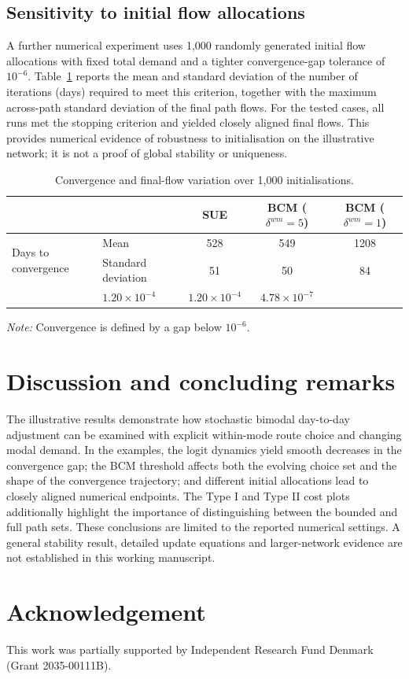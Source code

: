 \documentclass[11pt,a4paper]{article}
\begin{document}
\subsection{Sensitivity to initial flow allocations}

A further numerical experiment uses 1,000 randomly generated initial flow allocations with fixed total demand and a tighter convergence-gap tolerance of $10^{-6}$. Table~\ref{tab:stability} reports the mean and standard deviation of the number of iterations (days) required to meet this criterion, together with the maximum across-path standard deviation of the final path flows. For the tested cases, all runs met the stopping criterion and yielded closely aligned final flows. This provides numerical evidence of robustness to initialisation on the illustrative network; it is not a proof of global stability or uniqueness.

\begin{table}[tbp]
\centering
\caption{Convergence and final-flow variation over 1,000 initialisations.}
\label{tab:stability}
\small
\begin{tabular}{llccc}
\toprule
 & & SUE & BCM ($\delta^{wm}=5$) & BCM ($\delta^{wm}=1$)\\
\midrule
\multirow{2}{*}{Days to convergence} & Mean & 528 & 549 & 1208\\
 & Standard deviation & 51 & 50 & 84\\
\addlinespace[2pt]
\multicolumn{2}{l}{Max. standard deviation of final path flows} & $1.20\times10^{-4}$ & $1.20\times10^{-4}$ & $4.78\times10^{-7}$\\
\bottomrule
\end{tabular}
\vspace{0.3em}
\parbox{0.94\linewidth}{\footnotesize\emph{Note:} Convergence is defined by a gap below $10^{-6}$.}
\end{table}


\section{Discussion and concluding remarks}\label{sec:conclusion}

The illustrative results demonstrate how stochastic bimodal day-to-day adjustment can be examined with explicit within-mode route choice and changing modal demand. In the examples, the logit dynamics yield smooth decreases in the convergence gap; the BCM threshold affects both the evolving choice set and the shape of the convergence trajectory; and different initial allocations lead to closely aligned numerical endpoints. The Type I and Type II cost plots additionally highlight the importance of distinguishing between the bounded and full path sets. These conclusions are limited to the reported numerical settings. A general stability result, detailed update equations and larger-network evidence are not established in this working manuscript.

\section*{Acknowledgement}

This work was partially supported by Independent Research Fund Denmark (Grant 2035-00111B).

\nocite{*}


\end{document}
